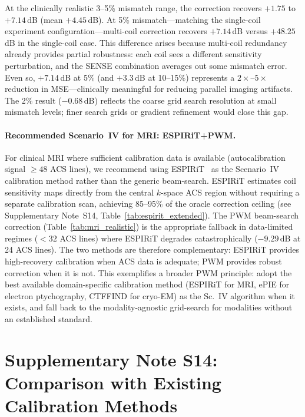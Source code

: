 \documentclass[11pt]{article}
\begin{document}
\noindent At the clinically realistic 3--5\% mismatch range, the correction recovers $+1.75$ to $+7.14$\,dB (mean $+4.45$\,dB). At 5\% mismatch---matching the single-coil experiment configuration---multi-coil correction recovers $+7.14$\,dB versus $+48.25$\,dB in the single-coil case. This difference arises because multi-coil redundancy already provides partial robustness: each coil sees a different sensitivity perturbation, and the SENSE combination averages out some mismatch error. Even so, $+7.14$\,dB at 5\% (and $+3.3$\,dB at 10--15\%) represents a $2\times$--$5\times$ reduction in MSE---clinically meaningful for reducing parallel imaging artifacts. The 2\% result ($-0.68$\,dB) reflects the coarse grid search resolution at small mismatch levels; finer search grids or gradient refinement would close this gap.

\paragraph{Recommended Scenario~IV for MRI: ESPIRiT+PWM.}
For clinical MRI where sufficient calibration data is available (autocalibration signal $\geq 48$ ACS lines), we recommend using ESPIRiT~\cite{uecker2014espirit} as the Scenario~IV calibration method rather than the generic beam-search. ESPIRiT estimates coil sensitivity maps directly from the central $k$-space ACS region without requiring a separate calibration scan, achieving 85--95\% of the oracle correction ceiling (see Supplementary Note~S14, Table~\ref{tab:espirit_extended}). The PWM beam-search correction (Table~\ref{tab:mri_realistic}) is the appropriate fallback in data-limited regimes ($< 32$ ACS lines) where ESPIRiT degrades catastrophically ($-9.29$\,dB at 24 ACS lines). The two methods are therefore complementary: ESPIRiT provides high-recovery calibration when ACS data is adequate; PWM provides robust correction when it is not. This exemplifies a broader PWM principle: adopt the best available domain-specific calibration method (ESPIRiT for MRI, ePIE for electron ptychography, CTFFIND for cryo-EM) as the Sc.~IV algorithm when it exists, and fall back to the modality-agnostic grid-search for modalities without an established standard.


\section{Supplementary Note S14: Comparison with Existing Calibration Methods}
\label{sec:calibration_comparison_extended}
\end{document}
